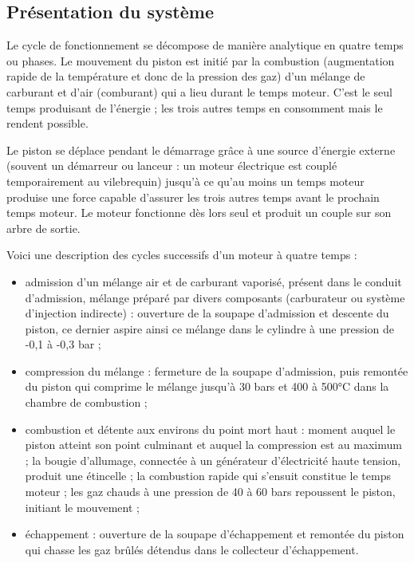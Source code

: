 \subsection{Présentation du système}

Le cycle de fonctionnement se décompose de manière analytique en quatre temps ou phases. Le mouvement du piston est initié par la combustion (augmentation rapide de la température et donc de la pression des gaz) d'un mélange de carburant et d'air (comburant) qui a lieu durant le temps moteur. C'est le seul temps produisant de l'énergie ; les trois autres temps en consomment mais le rendent possible.

Le piston se déplace pendant le démarrage grâce à une source d'énergie externe (souvent un démarreur ou lanceur : un moteur électrique est couplé temporairement au vilebrequin) jusqu'à ce qu'au moins un temps moteur produise une force capable d'assurer les trois autres temps avant le prochain temps moteur. Le moteur fonctionne dès lors seul et produit un couple sur son arbre de sortie.

Voici une description des cycles successifs d'un moteur à quatre temps :

\begin{itemize}
 \item admission d'un mélange air et de carburant vaporisé, présent dans le conduit d'admission, mélange préparé par divers composants (carburateur ou système d'injection indirecte) : ouverture de la soupape d'admission et descente du piston, ce dernier aspire ainsi ce mélange dans le cylindre à une pression de -0,1 à -0,3 bar ;
 \item compression du mélange : fermeture de la soupape d'admission, puis remontée du piston qui comprime le mélange jusqu'à 30 bars et 400 à 500°C dans la chambre de combustion ;
 \item combustion et détente aux environs du point mort haut : moment auquel le piston atteint son point culminant et auquel la compression est au maximum ; la bougie d'allumage, connectée à un générateur d'électricité haute tension, produit une étincelle ; la combustion rapide qui s'ensuit constitue le temps moteur ; les gaz chauds à une pression de 40 à 60 bars repoussent le piston, initiant le mouvement ;
 \item échappement : ouverture de la soupape d'échappement et remontée du piston qui chasse les gaz brûlés détendus dans le collecteur d'échappement.
\end{itemize}

